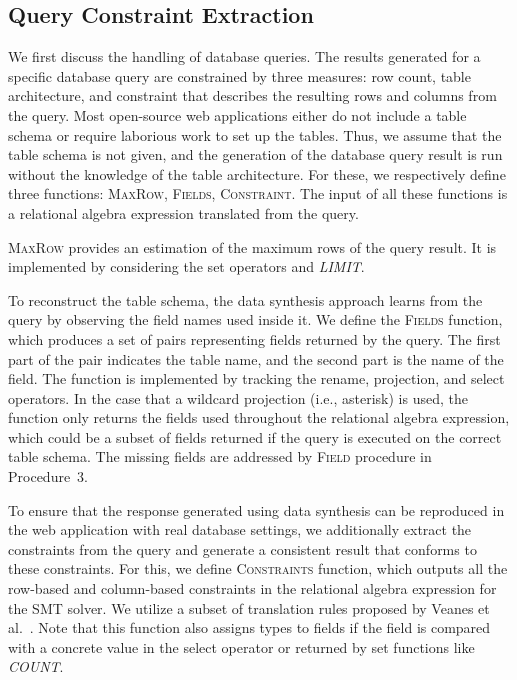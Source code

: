 \documentclass[10pt,conference]{IEEEtran}
\begin{document}
\subsection{Query Constraint Extraction}
\label{subsec:query-constraint-extraction}
We first discuss the handling of database queries. 
The results generated for a specific database query are constrained by three measures: row count, table architecture, and constraint that describes the resulting rows and columns from the query. Most open-source web applications either do not include a table schema or require laborious work to set up the tables. Thus, we assume that the table schema is not given, and the generation of the database query result is run without the knowledge of the table architecture. For these, we respectively define three functions: \textsc{MaxRow}, \textsc{Fields}, \textsc{Constraint}. The input of all these functions is a relational algebra expression translated from the query. 

\textsc{MaxRow} provides an estimation of the maximum rows of the query result. It is implemented by considering the set operators and \textit{LIMIT}.  

To reconstruct the table schema, the data synthesis approach learns from the query by observing the field names used inside it. We define the \textsc{Fields} function, which produces a set of pairs representing fields returned by the query. The first part of the pair indicates the table name, and the second part is the name of the field. The function is implemented by tracking the rename, projection, and select operators. In the case that a wildcard projection (i.e., asterisk) is used, the function only returns the fields used throughout the relational algebra expression, which could be a subset of fields returned if the query is executed on the correct table schema. The missing fields are addressed by \textsc{Field} procedure in Procedure~3.%

To ensure that the response generated using data synthesis can be reproduced in the web application with real database settings, we additionally extract the constraints from the query and generate a consistent result that conforms to these constraints. For this, we define \textsc{Constraints} function, which outputs all the row-based and column-based constraints in the relational algebra expression for the SMT solver. We utilize a subset of translation rules proposed by Veanes et al.~\cite{veanes2009qex}. Note that this function also assigns types to fields if the field is compared with a concrete value in the select operator or returned by set functions like \textit{COUNT}.
\end{document}
